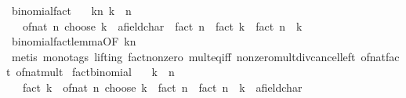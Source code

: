 \begin{isabellebody}
\endisatagproof
{\isafoldproof}%
%
\isadelimproof
\isanewline
%
\endisadelimproof
\isanewline
{}\isamarkupfalse%
\ binomial{\isacharunderscore}{\kern0pt}fact{\isacharcolon}{\kern0pt}\isanewline
\ \ \ kn{\isacharcolon}{\kern0pt}\ {\isachardoublequoteopen}k\ {\isasymle}\ n{\isachardoublequoteclose}\isanewline
\ \ \ {\isachardoublequoteopen}{\isacharparenleft}{\kern0pt}of{\isacharunderscore}{\kern0pt}nat\ {\isacharparenleft}{\kern0pt}n\ choose\ k{\isacharparenright}{\kern0pt}\ {\isacharcolon}{\kern0pt}{\isacharcolon}{\kern0pt}\ {\isacharprime}{\kern0pt}a{\isacharcolon}{\kern0pt}{\isacharcolon}{\kern0pt}field{\isacharunderscore}{\kern0pt}char{\isacharunderscore}{\kern0pt}{}{\isacharparenright}{\kern0pt}\ {\isacharequal}{\kern0pt}\ fact\ n\ {\isacharslash}{\kern0pt}\ {\isacharparenleft}{\kern0pt}fact\ k\ {\isacharasterisk}{\kern0pt}\ fact\ {\isacharparenleft}{\kern0pt}n\ {\isacharminus}{\kern0pt}\ k{\isacharparenright}{\kern0pt}{\isacharparenright}{\kern0pt}{\isachardoublequoteclose}\isanewline
%
\isadelimproof
\ \ %
\endisadelimproof
%
\isatagproof
{}\isamarkupfalse%
\ binomial{\isacharunderscore}{\kern0pt}fact{\isacharunderscore}{\kern0pt}lemma{\isacharbrackleft}{\kern0pt}OF\ kn{\isacharbrackright}{\kern0pt}\isanewline
\ \ \isamarkupfalse%
\ {\isacharparenleft}{\kern0pt}metis\ {\isacharparenleft}{\kern0pt}mono{\isacharunderscore}{\kern0pt}tags{\isacharcomma}{\kern0pt}\ lifting{\isacharparenright}{\kern0pt}\ fact{\isacharunderscore}{\kern0pt}nonzero\ mult{\isacharunderscore}{\kern0pt}eq{\isacharunderscore}{\kern0pt}{}{\isacharunderscore}{\kern0pt}iff\ nonzero{\isacharunderscore}{\kern0pt}mult{\isacharunderscore}{\kern0pt}div{\isacharunderscore}{\kern0pt}cancel{\isacharunderscore}{\kern0pt}left\ of{\isacharunderscore}{\kern0pt}nat{\isacharunderscore}{\kern0pt}fact\ of{\isacharunderscore}{\kern0pt}nat{\isacharunderscore}{\kern0pt}mult{\isacharparenright}{\kern0pt}%
\endisatagproof
{\isafoldproof}%
%
\isadelimproof
\isanewline
%
\endisadelimproof
\isanewline
{}\isamarkupfalse%
\ fact{\isacharunderscore}{\kern0pt}binomial{\isacharcolon}{\kern0pt}\isanewline
\ \ \ {\isachardoublequoteopen}k\ {\isasymle}\ n{\isachardoublequoteclose}\isanewline
\ \ \ {\isachardoublequoteopen}fact\ k\ {\isacharasterisk}{\kern0pt}\ of{\isacharunderscore}{\kern0pt}nat\ {\isacharparenleft}{\kern0pt}n\ choose\ k{\isacharparenright}{\kern0pt}\ {\isacharequal}{\kern0pt}\ {\isacharparenleft}{\kern0pt}fact\ n\ {\isacharslash}{\kern0pt}\ fact\ {\isacharparenleft}{\kern0pt}n\ {\isacharminus}{\kern0pt}\ k{\isacharparenright}{\kern0pt}\ {\isacharcolon}{\kern0pt}{\isacharcolon}{\kern0pt}\ {\isacharprime}{\kern0pt}a{\isacharcolon}{\kern0pt}{\isacharcolon}{\kern0pt}field{\isacharunderscore}{\kern0pt}char{\isacharunderscore}{\kern0pt}{}{\isacharparenright}{\kern0pt}{\isachardoublequoteclose}\isanewline

\end{isabellebody}
